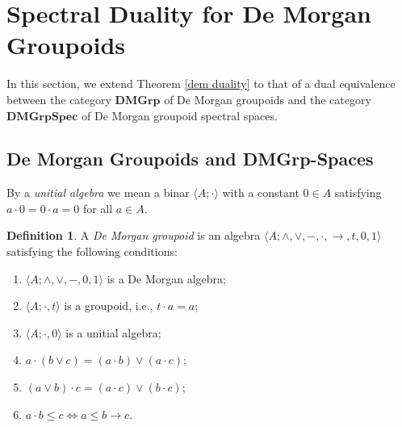 \documentclass{amsart}
\theoremstyle{plain}
\theoremstyle{definition}
\newtheorem{definition}[theorem]{Definition}
\begin{document}
\section{Spectral Duality for De Morgan Groupoids}
In this section, we extend Theorem \ref{dem duality} to that of a dual equivalence between the category $\mathbf{DMGrp}$ of De Morgan groupoids and the category $\mathbf{DMGrpSpec}$ of De Morgan groupoid spectral spaces. 
\subsection{De Morgan Groupoids and DMGrp-Spaces}
By a \emph{unitial algebra} we mean a binar $\langle A;\cdot\rangle$ with a constant $0\in A$ satisfying $a\cdot 0=0\cdot a=0$ for all $a\in A$.    
\begin{definition}\label{dem groupoid}
A \emph{De Morgan groupoid} is an algebra $\langle A;\wedge,\vee,-,\cdot,\rightarrow,t,0,1\rangle$ satisfying the following conditions: 
\begin{enumerate}
    \item $\langle A;\wedge,\vee,-,0,1\rangle$ is a De Morgan algebra; 
    \item $\langle A;\cdot,t\rangle$ is a groupoid, i.e., $t\cdot a=a$; 
    \item $\langle A;\cdot,0\rangle$ is a unitial algebra; 
    \item $a\cdot(b\vee c)=(a\cdot b)\vee(a\cdot c)$; 
    \item $(a\vee b)\cdot c=(a\cdot c)\vee(b\cdot c)$; 
    \item $a\cdot b\leq c\Leftrightarrow a\leq b\rightarrow c$. 
\end{enumerate}
\end{definition}
\end{document}
